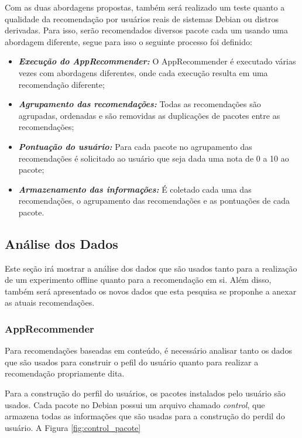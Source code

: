 Com as duas abordagens propostas, também será realizado um teste quanto a
qualidade da recomendação por usuários reais de sistemas Debian ou distros
derivadas. Para isso, serão recomendados diversos pacote cada um usando uma
abordagem diferente, segue para isso o seguinte processo foi definido:

\begin{itemize}
    \item \textit{\textbf{Execução do AppRecommender:}} O AppRecommender é
        executado várias vezes com abordagens diferentes, onde cada execução resulta em uma recomendação diferente;
    \item \textit{\textbf{Agrupamento das recomendações:}} Todas as recomendações são agrupadas, ordenadas e são removidas as duplicações de pacotes entre as recomendações;
    \item \textit{\textbf{Pontuação do usuário:}} Para cada pacote no agrupamento das recomendações é solicitado ao usuário que seja dada uma nota de 0 a 10 ao pacote;
    \item \textit{\textbf{Armazenamento das informações:}} É coletado cada uma das recomendações, o agrupamento das recomendações e as pontuações de cada pacote.
\end{itemize}

\subsection{Análise dos Dados}

Este seção irá mostrar a análise dos dados que são usados tanto para a
realização de um experimento offline quanto para a recomendação em si. Além
disso, também será apresentado os novos dados que esta pesquisa se proponhe a
anexar as atuais recomendações.

\subsubsection{AppRecommender}


Para recomendações baseadas em conteúdo, é necessário analisar tanto os dados
que são usados para construir o pefil do usuário quanto para realizar a
recomendação propriamente dita.

Para a construção do perfil do usuários, os pacotes instalados pelo usuário são
usados. Cada pacote no Debian possui um arquivo chamado \textit{control}, que
armazena todas as informações que são usadas para a construção do perdil do
usuário. A Figura \ref{fig:control_pacote}

